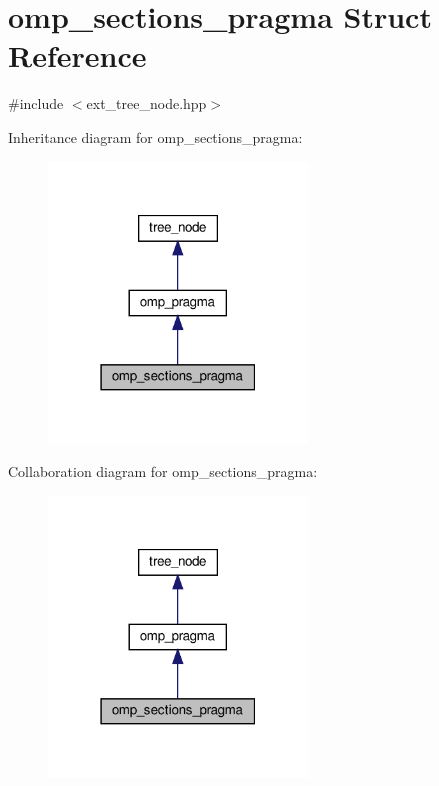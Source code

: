 \hypertarget{structomp__sections__pragma}{}\section{omp\+\_\+sections\+\_\+pragma Struct Reference}
\label{structomp__sections__pragma}


{\ttfamily \#include $<$ext\+\_\+tree\+\_\+node.\+hpp$>$}



Inheritance diagram for omp\+\_\+sections\+\_\+pragma\+:
\nopagebreak
\begin{figure}[H]
\begin{center}
\leavevmode
\includegraphics[width=195pt]{da/d58/structomp__sections__pragma__inherit__graph}
\end{center}
\end{figure}


Collaboration diagram for omp\+\_\+sections\+\_\+pragma\+:
\nopagebreak
\begin{figure}[H]
\begin{center}
\leavevmode
\includegraphics[width=195pt]{d0/dbc/structomp__sections__pragma__coll__graph}
\end{center}
\end{figure}
